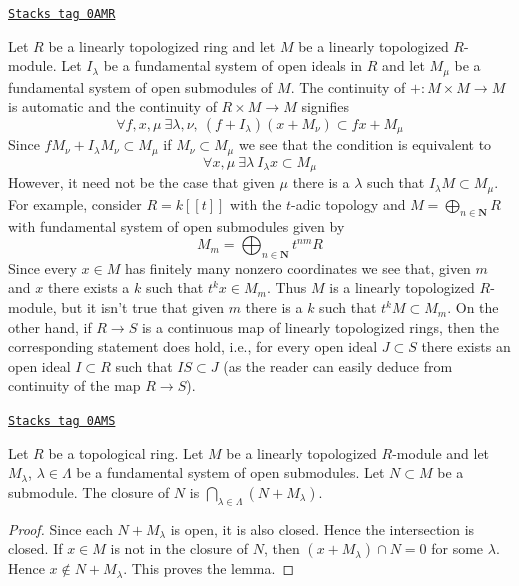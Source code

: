 \begin{example}
\label{formal-spaces-example-what-does-it-mean}
\href{https://stacks.math.columbia.edu/tag/0AMR}{\texttt{Stacks tag 0AMR}}

Let $R$ be a linearly topologized ring and let $M$ be a linearly
topologized $R$-module. Let $I_\lambda$ be a fundamental system of
open ideals in $R$ and let $M_\mu$ be a fundamental system of
open submodules of $M$. The continuity of $+ : M \times M \to M$
is automatic and the continuity of $R \times M \to M$ signifies
$$
\forall f, x, \mu\ \exists \lambda, \nu,\ (f + I_\lambda)(x + M_\nu)
\subset fx + M_\mu
$$
Since $fM_\nu + I_\lambda M_\nu \subset M_\mu$ if
$M_\nu \subset M_\mu$ we see that the condition is equivalent to
$$
\forall x, \mu\ \exists \lambda\ I_\lambda x \subset M_\mu
$$
However, it need not be the case that given $\mu$ there is a $\lambda$
such that $I_\lambda M \subset M_\mu$. For example, consider
$R = k[[t]]$ with the $t$-adic topology and
$M = \bigoplus_{n \in \mathbf{N}} R$ with fundamental system of
open submodules given by
$$
M_m = \bigoplus\nolimits_{n \in \mathbf{N}} t^{nm}R
$$
Since every $x \in M$ has finitely many nonzero coordinates we see
that, given $m$ and $x$ there exists a $k$ such that $t^k x \in M_m$.
Thus $M$ is a linearly topologized $R$-module, but it isn't true
that given $m$ there is a $k$ such that $t^kM \subset M_m$.
On the other hand, if $R \to S$ is a continuous map of linearly
topologized rings, then the corresponding statement does hold, i.e.,
for every open ideal $J \subset S$ there exists an open ideal
$I \subset R$ such that $IS \subset J$ (as the reader can easily
deduce from continuity of the map $R \to S$).
\end{example}

\begin{lemma}[Closed]
\label{formal-spaces-lemma-closed}
\href{https://stacks.math.columbia.edu/tag/0AMS}{\texttt{Stacks tag 0AMS}}

Let $R$ be a topological ring. Let $M$ be a linearly topologized
$R$-module and let $M_\lambda$, $\lambda \in \Lambda$ be a fundamental
system of open submodules. Let $N \subset M$ be a submodule.
The closure of $N$ is $\bigcap_{\lambda \in \Lambda} (N + M_\lambda)$.
\end{lemma}

\begin{proof}
Since each $N + M_\lambda$ is open, it is also closed. Hence the
intersection is closed. If $x \in M$ is not in the closure of $N$,
then $(x + M_\lambda) \cap N = 0$ for some $\lambda$. Hence
$x \not \in N + M_\lambda$. This proves the lemma.
\end{proof}

